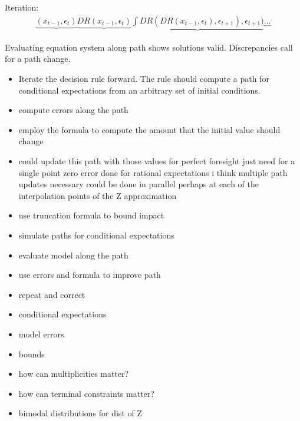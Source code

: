 \documentclass[12pt]{article}
\begin{document}
Iteration:
\begin{gather}
\underbrace{(x_{t-1},\epsilon_t)} 
\underbrace{DR(x_{t-1},\epsilon_t)}
\underbrace{\int DR(DR(x_{t-1},\epsilon_t),\epsilon_{t+1}),\epsilon_{t+1})}
\underbrace{\ldots}
\end{gather}

Evaluating equation system along path shows solutions valid. Discrepancies call for a path change.

\label{sec:assess}
\begin{itemize}
\item Iterate the decision rule forward.  The rule should compute a path for conditional expectations from an arbitrary set of initial conditions.
\item compute errors along the path
\item employ the formula to compute the amount that the initial value should change
\item could update this path with those values for perfect foresight
just need for a single point zero error done for rational expectations 
i think multiple path updates necessary could be done in parallel perhaps at each of the interpolation points of the Z approximation
\item use truncation formula to bound impact
\end{itemize}









\begin{itemize}
\item simulate paths for conditional expectations
\item evaluate model along the path
\item use errors and formula to improve path 
\item repeat and correct
\item conditional expectations
\item model errors
\item bounds
\item how can multiplicities matter?  
\item how can terminal constraints matter?
\item bimodal distributions for dist of Z
\end{itemize}
\end{document}
